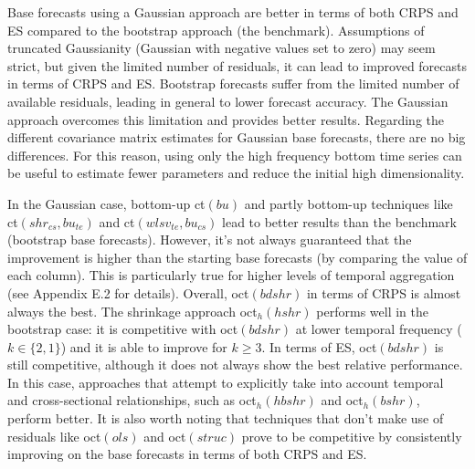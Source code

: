 \documentclass[12pt]{article}
\theoremstyle{definition}
\begin{document}
Base forecasts using a Gaussian approach are better in terms of both CRPS and ES compared to the bootstrap approach (the benchmark). Assumptions of truncated Gaussianity (Gaussian with negative values set to zero) may seem strict, but given the limited number of residuals, it can lead to improved forecasts in terms of CRPS and ES. Bootstrap forecasts suffer from the limited number of available residuals, leading in general to lower forecast accuracy. The Gaussian approach overcomes this limitation and provides better results. Regarding the different covariance matrix estimates for Gaussian base forecasts, there are no big differences. For this reason, using only the high frequency bottom time series can be useful to estimate fewer parameters and reduce the initial high dimensionality.

In the Gaussian case, bottom-up ct$(bu)$ and partly bottom-up techniques like ct$(shr_{cs}, bu_{te})$ and ct$(wlsv_{te}, bu_{cs})$ lead to better results than the benchmark (bootstrap base forecasts). However, it's not always guaranteed that the improvement is higher than the starting base forecasts (by comparing the value of each column). This is particularly true for higher levels of temporal aggregation (see Appendix E.2 for details). Overall, oct$(bdshr)$ in terms of CRPS is almost always the best. The shrinkage approach oct$_h(hshr)$ performs well in the bootstrap case: it is competitive with oct$(bdshr)$ at lower temporal frequency ($k \in \{2,1\}$) and it is able to improve for $k\ge 3$. In terms of ES, oct$(bdshr)$ is still competitive, although it does not always show the best relative performance. In this case, approaches that attempt to explicitly take into account temporal and cross-sectional relationships, such as oct$_h(hbshr)$ and oct$_h(bshr)$, perform better. It is also worth noting that techniques that don't make use of residuals like oct$(ols)$ and oct$(struc)$ prove to be competitive by consistently improving on the base forecasts in terms of both CRPS and ES.
\end{document}
